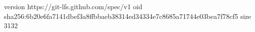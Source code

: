 version https://git-lfs.github.com/spec/v1
oid sha256:6b20e6fa7141dbef3a8ffbbaeb38314ed34334e7c8685a71744e03bea7f78cf5
size 3132
